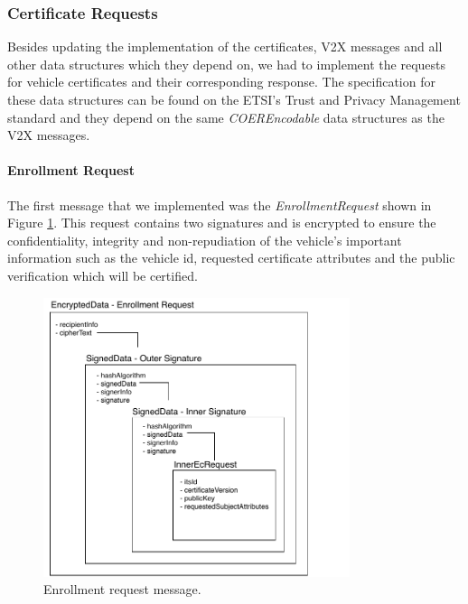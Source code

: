 \subsubsection{Certificate Requests} \label{requests}
Besides updating the implementation of the certificates, V2X messages and all other data structures which they depend on, we had to implement the requests for vehicle certificates and their corresponding response. The specification for these data structures can be found on the ETSI's Trust and Privacy Management standard \cite{etsi_privacy} and they depend on the same \textit{COEREncodable} data structures as the V2X messages. 


\paragraph{Enrollment Request}
The first message that we implemented was the \textit{EnrollmentRequest} shown in Figure \ref{fig:enrollment_request}. This request contains two signatures and is encrypted to ensure the confidentiality, integrity and non-repudiation of the vehicle's important information such as the vehicle id, requested certificate attributes and the public verification which will be certified.

\begin{figure}[!htb]
	\centering
	\includegraphics[width=0.8\textwidth]{Figures/enrollmentrequest}
	\caption{\label{fig:enrollment_request}Enrollment request message.}
\end{figure}

